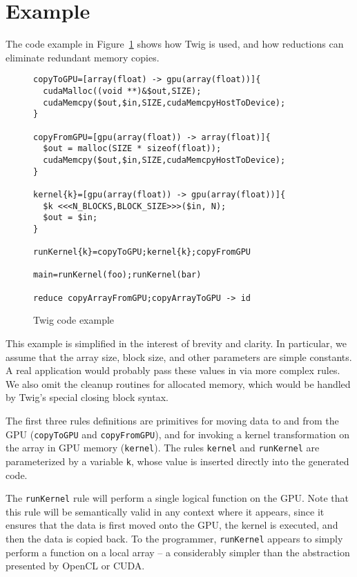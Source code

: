 
\section{Example}

The code example in Figure~\ref{fig:example-code} shows how Twig is used, and
how reductions can eliminate redundant memory copies.

\begin{figure}[ht]
\begin{verbatim}
copyToGPU=[array(float) -> gpu(array(float))]{
  cudaMalloc((void **)&$out,SIZE);
  cudaMemcpy($out,$in,SIZE,cudaMemcpyHostToDevice);
}

copyFromGPU=[gpu(array(float)) -> array(float)]{
  $out = malloc(SIZE * sizeof(float));
  cudaMemcpy($out,$in,SIZE,cudaMemcpyHostToDevice);
}

kernel{k}=[gpu(array(float)) -> gpu(array(float))]{
  $k <<<N_BLOCKS,BLOCK_SIZE>>>($in, N);
  $out = $in;
}

runKernel{k}=copyToGPU;kernel{k};copyFromGPU

main=runKernel(foo);runKernel(bar)

reduce copyArrayFromGPU;copyArrayToGPU -> id
\end{verbatim}
\caption{Twig code example}
\label{fig:example-code}
\end{figure}

This example is simplified in the interest of brevity and clarity. In
particular, we assume that the array size, block size, and other parameters are
simple constants. A real application would probably pass these values in via
more complex rules. We also omit the cleanup routines for allocated memory,
which would be handled by Twig's special closing block syntax.

The first three rules definitions are primitives for moving data to and from the
GPU (\texttt{copyToGPU} and \texttt{copyFromGPU}), and for invoking a kernel
transformation on the array in GPU memory (\texttt{kernel}). The rules
\texttt{kernel} and \texttt{runKernel} are parameterized by a variable
\texttt{k}, whose value is inserted directly into the generated code.

The \texttt{runKernel} rule will perform a single logical function on the GPU.
Note that this rule will be semantically valid in any context where it appears,
since it ensures that the data is first moved onto the GPU, the kernel is
executed, and then the data is copied back. To the programmer,
\texttt{runKernel} appears to simply perform a function on a local array -- a
considerably simpler than the abstraction presented by OpenCL or CUDA.

